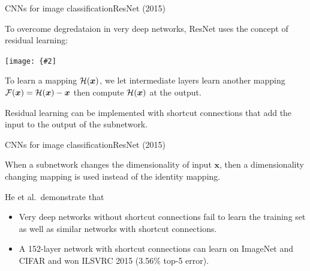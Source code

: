 \documentclass{beamer}
\renewcommand{\vec}[1]{\boldsymbol{#1}}
\newcommand{\myfig}[3]{\centerline{\texttt{[image: \{\#2]}}}
\begin{document}
\begin{frame}{CNNs for image classification}{ResNet (2015)}

  To overcome degredataion in very deep networks, ResNet uses the
  concept of \alert{residual learning}:

  \medskip

  \myfig{2in}{he-fig2}{He et al.\ (2016), Fig.\ 2}

  \medskip

  To learn a mapping ${\cal H}(\vec{x})$, we let intermediate layers
  learn another mapping ${\cal F}(\vec{x}) = {\cal H}(\vec{x})-\vec{x}$
  then compute ${\cal H}(\vec{x})$ at the output.

  \medskip

  Residual learning can be implemented with \alert{shortcut
    connections} that add the input to the output of the subnetwork.
  
\end{frame}


\begin{frame}{CNNs for image classification}{ResNet (2015)}

  When a subnetwork changes the dimensionality of input $\vec{x}$,
  then a dimensionality changing mapping is used instead of the
  identity mapping.

  \medskip
  
  He et al.\ demonstrate that
  \begin{itemize}
    \item Very deep networks without shortcut connections fail to
      learn the training set as well as similar networks with shortcut
      connections.
    \item A \alert{152-layer network} with shortcut connections can
      learn on ImageNet and CIFAR and won ILSVRC 2015 (3.56\% top-5
      error).
  \end{itemize}
  
\end{frame}
\end{document}
